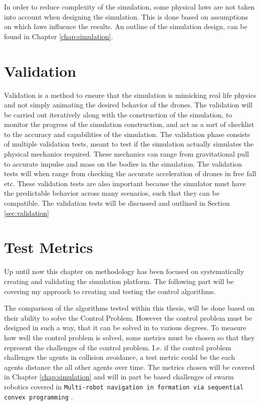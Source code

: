 In order to reduce complexity of the simulation, some physical laws are not taken into account when designing the simulation. This is done based on assumptions on which laws influence the results. An outline of the simulation design, can be found in Chapter \ref{chap:simulation}. 

\section{Validation}
Validation is a method to ensure that the simulation is mimicking real life physics and not simply animating the desired behavior of the drones. The validation will be carried out iteratively along with the construction of the simulation, to monitor the progress of the simulation construction, and act as a sort of checklist to the accuracy and capabilities of the simulation. The validation phase consists of multiple validation tests, meant to test if the simulation actually simulates the physical mechanics required. These mechanics can range from gravitational pull to accurate impulse and mass on the bodies in the simulation. The validation tests will when range from checking the accurate acceleration of drones in free fall etc. These validation tests are also important because the simulator must have the predictable behavior across many scenarios, such that they can be compatible. The validation tests will be discussed and outlined in Section \ref{sec:validation}

\section{Test Metrics}
Up until now this chapter on methodology has been focused on systematically creating and validating the simulation platform. The following part will be covering my approach to creating and testing the control algorithms. 

The comparison of the algorithms tested within this thesis, will be done based on their ability to solve the Control Problem. However the control problem must be designed in such a way, that it can be solved in to various degrees. To measure how well the control problem is solved, some metrics must be chosen so that they represent the challenges of the control problem. I.e. if the control problem challenges the agents in collision avoidance, a test metric could be the each agents distance the all other agents over time. The metrics chosen will be covered in Chapter \ref{chap:simulation} and will in part be based challenges of swarm robotics covered in \texttt{Multi-robot navigation in formation via sequential convex programming} \cite{alonso-mora_multi-robot_2015}.

